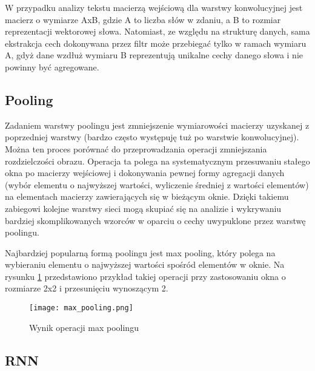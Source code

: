 W przypadku analizy tekstu macierzą wejściową dla warstwy konwolucyjnej jest macierz o wymiarze AxB, gdzie A to liczba słów w zdaniu, a B to rozmiar reprezentacji wektorowej słowa. Natomiast, ze względu na strukturę danych, sama ekstrakcja cech dokonywana przez filtr może przebiegać tylko w ramach wymiaru A, gdyż dane wzdłuż wymiaru B reprezentują unikalne cechy danego słowa i nie powinny być agregowane\cite{cnn_3}.


\subsection{Pooling}



Zadaniem warstwy poolingu jest zmniejszenie wymiarowości macierzy uzyskanej z poprzedniej warstwy (bardzo często występuję tuż po warstwie konwolucyjnej). Można ten proces porównać do przeprowadzania operacji zmniejszania rozdzielczości obrazu. Operacja ta polega na systematycznym przesuwaniu stałego okna po macierzy wejściowej i dokonywania pewnej formy agregacji danych (wybór elementu o najwyższej wartości, wyliczenie średniej z wartości elementów) na elementach macierzy zawierających się w bieżącym oknie. Dzięki takiemu zabiegowi kolejne warstwy sieci mogą skupiać się na analizie i wykrywaniu bardziej skomplikowanych wzorców w oparciu o cechy uwypuklone przez warstwę poolingu. \cite{pooling_1} \cite{pooling_2}

 

Najbardziej popularną formą poolingu jest max pooling, który polega na wybieraniu elementu o najwyższej wartości spośród elementów w oknie. Na rysunku \ref{fig:max_pooling} przedstawiono przykład takiej operacji przy zastosowaniu okna o rozmiarze 2x2 i przesunięciu wynoszącym 2. 

\begin{figure}[!h]
    \centering \texttt{[image: max\_pooling.png]}
    \caption{Wynik operacji max poolingu}
    \label{fig:max_pooling}
\end{figure}


\subsection{RNN}



